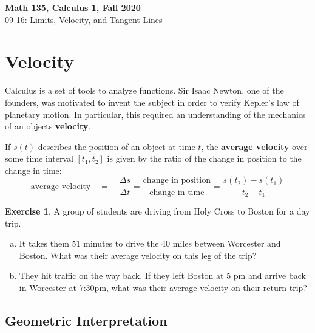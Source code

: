 \documentclass[11pt,reqno,final]{amsart}
\numberwithin{equation}{section}
\numberwithin{figure}{section}
\theoremstyle{definition} %
\newtheorem{exercise}[question]{Exercise}
\begin{document}
\begin{center}
        \textbf{\Large Math 135, Calculus 1, Fall 2020}\\[10pt]
        {\large 09-16: Limits, Velocity, and Tangent Lines}
\end{center}

\thispagestyle{empty}

\renewcommand{\thesection}{\Alph{section}}

\section{Velocity}

Calculus is a set of tools to analyze functions.
Sir Isaac Newton, one of the founders, was motivated to invent the subject in order to verify Kepler's law of planetary motion.
In particular, this required an understanding of the mechanics of an objects \textbf{velocity}.

\begin{framed}
        If $s(t)$ describes the position of an object at time $t$,
        the \textbf{average velocity} over some time interval $[t_1, t_2]$ is given by the ratio of the change in position to the change in time:
        \[
                \text{average velocity} \quad = \quad \dfrac{\Delta s}{\Delta t} = \dfrac{\text{change in position}}{\text{change in time}} =  \dfrac{s(t_2) - s(t_1)}{t_2-t_1}
        \]
\end{framed}

\begin{exercise}
        A group of students are driving from Holy Cross to Boston for a day trip.
        \begin{enumerate}[(a)]
        \item It takes them 51 minutes to drive the 40 miles between Worcester and Boston.
                What was their average velocity on this leg of the trip?
                \vfill
        \item They hit traffic on the way back. If they left Boston at 5 pm and arrive back in Worcester at 7:30pm, what was their average velocity on their return trip?
                \vfill
        \end{enumerate}
\end{exercise}

\subsection{Geometric Interpretation}
\end{document}

